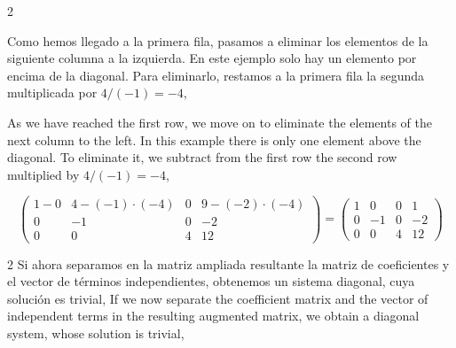 \begin{paracol}{2}

Como hemos llegado a la primera fila, pasamos a eliminar los elementos de la siguiente columna a la izquierda. En este ejemplo solo hay un elemento por encima de la diagonal. Para eliminarlo, restamos a la primera fila la segunda multiplicada por $4/(-1)=-4$,

\switchcolumn

As we have reached the first row, we move on to eliminate the elements of the next column to the left. In this example there is only one element above the diagonal. To eliminate it, we subtract from the first row the second row multiplied by $4/(-1)=-4$,

\end{paracol}

\begin{equation*}
\begin{pmatrix}
1-0&     4-(-1)\cdot(-4)&     0&    9-(-2)\cdot(-4)\\
 0&    -1&    0&    -2\\
 0&     0&     4&    12
\end{pmatrix}=\begin{pmatrix}
1&     0&     0&    1\\
 0&    -1&    0&    -2\\
 0&     0&     4&    12
\end{pmatrix}
\end{equation*}

\begin{paracol}{2}
Si ahora separamos en la matriz ampliada resultante la matriz de coeficientes y el vector de términos independientes, obtenemos un sistema diagonal, cuya solución es trivial,
\switchcolumn
If we now separate the coefficient matrix and the vector of independent terms in the resulting augmented matrix, we obtain a diagonal system, whose solution is trivial,
\end{paracol}


